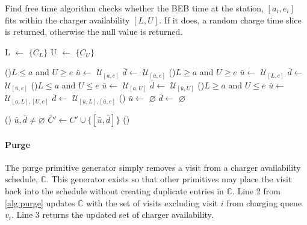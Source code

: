 \documentclass[11pt,a4paper,final]{article}
\newcommand{\C}{\mathbb{C}}                 %
\newcommand{\U}{\mathcal{U}}                %
\begin{document}
\begin{algorithm}[H]
\caption{Find free time algorithm checks whether the BEB time at the station, $[a_i, e_i]$ fits within the charger availability $[L,U]$. If it does, a random charge time slice is returned, otherwise the null value is returned.}
\label{alg:find-free-time}
    \LinesNumbered

    \Begin
    {
      L \(\leftarrow\) \(\{C_L\}\)\;
      U \(\leftarrow\) \(\{C_U\}\)\;

      \If(){$L \leq a$ and $U \geq e$}
      {
        $\bar{u}\leftarrow$ $\U_{[a,e]}$\;
        $\bar{d}\leftarrow$ $\U_{[\bar{u},e]}$\;
      }
      \ElseIf(){$L \ge a$ and $U \geq e$}
      {
        $\bar{u}\leftarrow$ $\U_{[L,e]}$\;
        $\bar{d}\leftarrow$ $\U_{[\bar{u},e]}$\;
      }
      \ElseIf(){$L \leq a$ and $U \le e$}
      {
        $\bar{u}\leftarrow$ $\U_{[a,U]}$\;
        $\bar{d}\leftarrow$ $\U_{[\bar{u},U]}$\;
      }
      \ElseIf(){$L \ge a$ and $U \le e$}
      {
        $\bar{u}\leftarrow$ $\U_{[a,L], [U,e]}$\;
        $\bar{d}\leftarrow$ $\U_{[\bar{u},L], [\bar{u},e]}$\;
      }
      \Else()
      {
        $\bar{u}\leftarrow$ $\varnothing$\;
        $\bar{d}\leftarrow$ $\varnothing$\;
      }

      \If () {$\bar{u},\bar{d} \ne \varnothing$}
      {
        $\bar{C}' \leftarrow C' \cup \{[\bar{u},\bar{d}]\}$
      }
      \Else()
      {
      }
    }
\end{algorithm}

\paragraph{Purge}
\label{sec:purge}
The purge primitive generator simply removes a visit from a charger availability schedule, \(\C\). This generator exists
so that other primitives may place the visit back into the schedule without creating duplicate entries in \(\C\). Line 2
from \ref{alg:purge} updates \(\C\) with the set of visits excluding visit \(i\) from charging queue \(v_i\). Line 3 returns
the updated set of charger availability.
\end{document}
